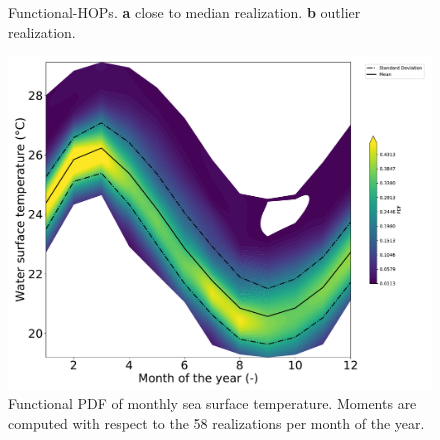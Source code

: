 \begin{figure}[!ht]               
\centering
{}
\caption{Functional-HOPs. \textbf{a} close to median realization. \textbf{b} outlier realization.}
\label{fig:f-hops}
\end{figure}

\begin{figure}[!ht]
\centering
\includegraphics[width=0.8\linewidth,keepaspectratio]{fig/contributions/visu/pdf.pdf}
\caption{Functional PDF of monthly sea surface temperature. Moments are computed with respect to the 58 realizations per month of the year.}
\label{fig:pdf}
\end{figure}

